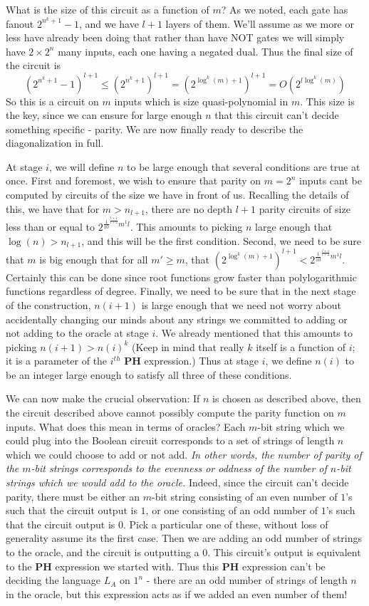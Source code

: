 What is the size of this circuit as a function of $m$? As we noted, each gate has fanout $2^{n^k+1}-1$, and we have $l+1$ layers of them. We'll assume as we more or less have already been doing that rather than have NOT gates we will simply have $2\times 2^n$ many inputs, each one having a negated dual. Thus the final size of the circuit is
\[ (2^{n^k+1}-1)^{l+1} \leq (2^{n^k+1})^{l+1} = (2^{\log^k(m)+1})^{l+1} = O(2^{l\log^k(m)}) \]
So this is a circuit on $m$ inputs which is size quasi-polynomial in $m$. This size is the key, since we can ensure for large enough $n$ that this circuit can't decide something specific - parity. We are now finally ready to describe the diagonalization in full. \par 
At stage $i$, we will define $n$ to be large enough that several conditions are true at once. First and foremost, we wish to ensure that parity on $m=2^n$ inputs cant be computed by circuits of the size we have in front of us. Recalling the details of this, we have that for $m > n_{l+1}$, there are no depth $l+1$ parity circuits of size less than or equal to $2^{\frac{1}{10}^{\frac{l+1}{l+2}}m^{1}{l}}$. This amounts to picking $n$ large enough that $\log(n) > n_{l+1}$, and this will be the first condition. Second, we need to be sure that $m$ is big enough that for all $m' \geq m$, that  $(2^{\log^k(m)+1})^{l+1} < 2^{\frac{1}{10}^{\frac{l+1}{l+2}}m^{1}{l}}$. Certainly this can be done since root functions grow faster than polylogarithmic functions regardless of degree. Finally, we need to be sure that in the next stage of the construction, $n(i+1)$ is large enough that we need not worry about accidentally changing our minds about any strings we committed to adding or not adding to the oracle at stage $i$. We already mentioned that this amounts to picking $n(i+1) > n(i)^k$ (Keep in mind that really $k$ itself is a function of $i$; it is a parameter of the $i^{th}$ $\bm{PH}$ expression.) Thus at stage $i$, we define $n(i)$ to be an integer large enough to satisfy all three of these conditions. \par 
We can now make the crucial observation: If $n$ is chosen as described above, then the circuit described above cannot possibly compute the parity function on $m$ inputs. What does this mean in terms of oracles? Each $m$-bit string which we could plug into the Boolean circuit corresponds to a set of strings of length $n$ which we could choose to add or not add. \emph{In other words, the number of parity of the $m$-bit strings corresponds to the evenness or oddness of the number of $n$-bit strings which we would add to the oracle.} Indeed, since the circuit can't decide parity, there must be either an $m$-bit string consisting of an even number of $1$'s such that the circuit output is $1$, or one consisting of an odd number of $1$'s such that the circuit output is $0$. Pick a particular one of these, without loss of generality assume its the first case. Then we are adding an odd number of strings to the oracle, and the circuit is outputting a $0$. This circuit's output is equivalent to the $\bm{PH}$ expression we started with. Thus this $\bm{PH}$ expression can't be deciding the language $L_A$ on $1^n$ - there are an odd number of strings of length $n$ in the oracle, but this expression acts as if we added an even number of them! \par 
